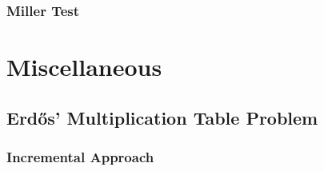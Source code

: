 \documentclass[12pt]{book}
\newcommand{\<}{\langle}
\renewcommand{\>}{\rangle}
\renewcommand{\(}{\left(}
\renewcommand{\)}{\right)}
\begin{document}
        \subsubsection{Miller Test}
            

    \section{Miscellaneous}
        \subsection{Erdős' Multiplication Table Problem}
            \subsubsection{Incremental Approach}
                

\printbibliography
\end{document}
